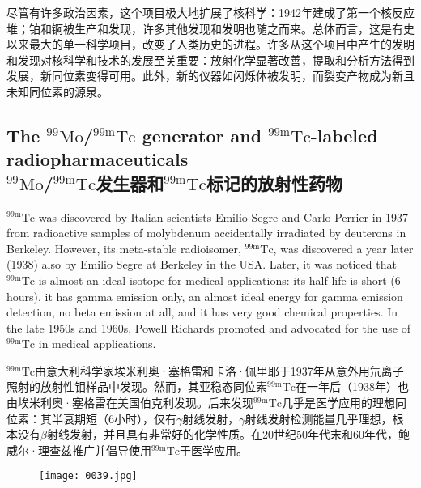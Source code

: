 \documentclass[dvipsnames, svgnames,a4paper,11pt]{article}
\begin{document}
尽管有许多政治因素，这个项目极大地扩展了核科学：1942年建成了第一个核反应堆；铂和锕被生产和发现，许多其他发现和发明也随之而来。总体而言，这是有史以来最大的单一科学项目，改变了人类历史的进程。许多从这个项目中产生的发明和发现对核科学和技术的发展至关重要：放射化学显著改善，提取和分析方法得到发展，新同位素变得可用。此外，新的仪器如闪烁体被发明，而裂变产物成为新且未知同位素的源泉。

\subsection{The ${}^\text{99}\text{Mo}$/${}^\text{99m}\text{Tc}$ generator and ${}^\text{99m}\text{Tc}$-labeled radiopharmaceuticals \\${}^\text{99}\text{Mo}$/${}^\text{99m}\text{Tc}$发生器和${}^\text{99m}\text{Tc}$标记的放射性药物}

${}^\text{99m}\text{Tc}$ was discovered by Italian scientists Emilio Segre and Carlo Perrier in 1937 from radioactive samples of molybdenum accidentally irradiated by deuterons in Berkeley. However, its meta-stable radioisomer, ${}^\text{99m}\text{Tc}$, was discovered a year later (1938) also by Emilio Segre at Berkeley in the USA. Later, it was noticed that ${}^\text{99m}\text{Tc}$ is almost an ideal isotope for medical applications: its half-life is short (6 hours), it has gamma emission only, an almost ideal energy for gamma emission detection, no beta emission at all, and it has very good chemical properties. In the late 1950s and 1960s, Powell Richards promoted and advocated for the use of ${}^\text{99m}\text{Tc}$ in medical applications.

${}^\text{99m}\text{Tc}$由意大利科学家埃米利奥·塞格雷和卡洛·佩里耶于1937年从意外用氘离子照射的放射性钼样品中发现。然而，其亚稳态同位素${}^\text{99m}\text{Tc}$在一年后（1938年）也由埃米利奥·塞格雷在美国伯克利发现。后来发现${}^\text{99m}\text{Tc}$几乎是医学应用的理想同位素：其半衰期短（6小时），仅有$\gamma$射线发射，$\gamma$射线发射检测能量几乎理想，根本没有$\beta$射线发射，并且具有非常好的化学性质。在20世纪50年代末和60年代，鲍威尔·理查兹推广并倡导使用${}^\text{99m}\text{Tc}$于医学应用。

\begin{figure}[htbp]
      \centering
      \texttt{[image: 0039.jpg]}
       \label{fig30}
\end{figure}
\end{document}
